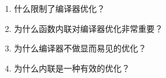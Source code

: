 \begin{enumerate}
\item 
什么限制了编译器优化？

\item 
为什么函数内联对编译器优化非常重要？

\item 
为什么编译器不做显而易见的优化？

\item
为什么内联是一种有效的优化？
	
\end{enumerate}